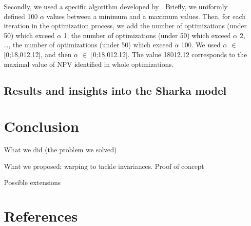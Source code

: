Secondly, we used a specific algorithm developed by . Briefly, we uniformly defined 100 $\alpha$ values between a minimum and a maximum values. Then, for each iteration in the optimization process, we add the number of optimizations (under 50) which exceed $\alpha$ 1, the number of optimizations (under 50) which exceed $\alpha$ 2, …, the number of optimizations (under 50) which exceed $\alpha$ 100. We used $\alpha$ $\in$ [0;18,012.12], and then $\alpha$ $\in$ [0;18,012.12]. The value 18012.12 corresponds to the maximal value of NPV identified in whole optimizations.


\subsection{Results and insights into the Sharka model}

\section{Conclusion}

What we did (the problem we solved)

What we proposed: warping to tackle invariances. Proof of concept

Possible extensions

\section*{References}
